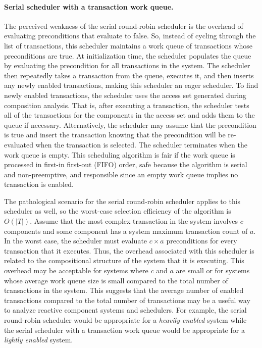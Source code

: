 \paragraph{Serial scheduler with a transaction work queue.}
The perceived weakness of the serial round-robin scheduler is the overhead of evaluating preconditions that evaluate to false.
So, instead of cycling through the list of transactions, this scheduler maintains a work queue of transactions whose preconditions are true.
At initialization time, the scheduler populates the queue by evaluating the precondition for all transactions in the system.
The scheduler then repeatedly takes a transaction from the queue, executes it, and then inserts any newly enabled transactions, making this scheduler an eager scheduler.
To find newly enabled transactions, the scheduler uses the access set generated during composition analysis.
That is, after executing a transaction, the scheduler tests all of the transactions for the components in the access set and adds them to the queue if necessary.
Alternatively, the scheduler may assume that the precondition is true and insert the transaction knowing that the precondition will be re-evaluated when the transaction is selected.
The scheduler terminates when the work queue is empty.
This scheduling algorithm is fair if the work queue is processed in first-in first-out (FIFO) order, safe because the algorithm is serial and non-preemptive, and responsible since an empty work queue implies no transaction is enabled.

The pathological scenario for the serial round-robin scheduler applies to this scheduler as well, so the worst-case selection efficiency of the algorithm is $O(|T|)$.
Assume that the most complex transaction in the system involves $c$ components and some component has a system maximum transaction count of $a$.
In the worst case, the scheduler must evaluate $c \times a$ preconditions for every transaction that it executes.
Thus, the overhead associated with this scheduler is related to the compositional structure of the system that it is executing.
This overhead may be acceptable for systems where $c$ and $a$ are small or for systems whose average work queue size is small compared to the total number of transactions in the system.
This suggests that the average number of enabled transactions compared to the total number of transactions may be a useful way to analyze reactive component systems and schedulers.
For example, the serial round-robin scheduler would be appropriate for a \emph{heavily enabled} system while the serial scheduler with a transaction work queue would be appropriate for a \emph{lightly enabled} system.

